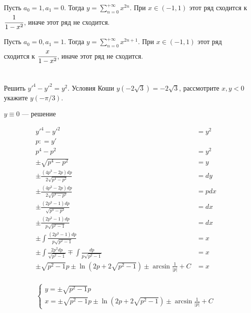 Пусть \(a_0 = 1, a_1 = 0\). Тогда \(y = \sum\limits_{n = 0}^{ +\infty} x^{2n}\). При \(x \in ( - 1, 1)\) этот ряд сходится к \(\cfrac{1}{1 - x^2}\), иначе этот ряд не сходится.

Пусть \(a_0 = 0, a_1 = 1\). Тогда \(y = \sum\limits_{n = 0}^{ +\infty} x^{2n + 1}\). При \(x \in ( - 1, 1)\) этот ряд сходится к \(\cfrac{x}{1 - x^2}\), иначе этот ряд не сходится.

\section{}

Решить \(y'^4- y'^2=y^2\). Условия Коши \(y(-2 \sqrt 3)=-2 \sqrt 3\), рассмотрите \(x,y<0\) укажите \(y(-\pi/3)\).

\(y \equiv 0\) --- решение

\begin{align*}
    y'^4- y'^2                                                                       & = y^2 \\
    p : = y'                                                                                 \\
    p^4 - p^2                                                                        & = y^2 \\
    \pm \sqrt{p^4 - p^2}                                                             & = y   \\
    \pm \frac{(4p^3 - 2p)dp}{2\sqrt{p^4 - p^2}}                                      & = dy  \\
    \pm \frac{(4p^3 - 2p)dp}{2\sqrt{p^4 - p^2}}                                      & = pdx \\
    \pm \frac{(2p^3 - 1)dp}{\sqrt{p^4 - p^2}}                                        & = dx  \\
    \pm \frac{(2p^3 - 1)dp}{p\sqrt{p^2 - 1}}                                         & = dx  \\
    \pm \int \frac{(2p^3 - 1)dp}{p\sqrt{p^2 - 1}}                                    & = x   \\
    \pm \int \frac{2p^2dp}{\sqrt{p^2 - 1}} \mp \int \frac{dp}{p \sqrt{p^2 - 1}}      & = x   \\
    \pm \sqrt{p^2 - 1}p \pm \ln(2p + 2 \sqrt{p^2 - 1}) \pm \arcsin \frac{1}{|p|} + C & = x   \\
\end{align*}

\[
    \begin{cases}
        y = \pm \sqrt{p^2 - 1}p \\
        x = \pm \sqrt{p^2 - 1}p \pm \ln(2p + 2 \sqrt{p^2 - 1}) \pm \arcsin \frac{1}{|p|} + C
    \end{cases}
\]

